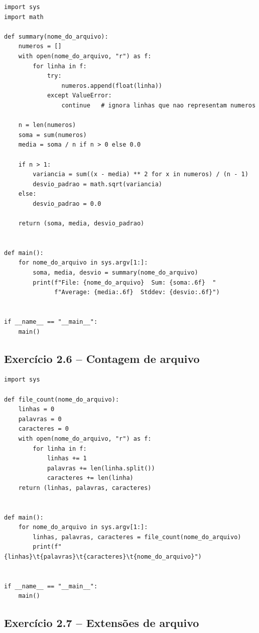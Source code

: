 \documentclass[11pt,a4paper]{article}
\begin{document}
\begin{solucao}
\begin{lstlisting}
import sys
import math

def summary(nome_do_arquivo):
    numeros = []
    with open(nome_do_arquivo, "r") as f:
        for linha in f:
            try:
                numeros.append(float(linha))
            except ValueError:
                continue   # ignora linhas que nao representam numeros

    n = len(numeros)
    soma = sum(numeros)
    media = soma / n if n > 0 else 0.0

    if n > 1:
        variancia = sum((x - media) ** 2 for x in numeros) / (n - 1)
        desvio_padrao = math.sqrt(variancia)
    else:
        desvio_padrao = 0.0

    return (soma, media, desvio_padrao)


def main():
    for nome_do_arquivo in sys.argv[1:]:
        soma, media, desvio = summary(nome_do_arquivo)
        print(f"File: {nome_do_arquivo}  Sum: {soma:.6f}  "
              f"Average: {media:.6f}  Stddev: {desvio:.6f}")


if __name__ == "__main__":
    main()
\end{lstlisting}
\end{solucao}

\subsection*{Exercício 2.6 -- Contagem de arquivo}

\begin{solucao}
\begin{lstlisting}
import sys

def file_count(nome_do_arquivo):
    linhas = 0
    palavras = 0
    caracteres = 0
    with open(nome_do_arquivo, "r") as f:
        for linha in f:
            linhas += 1
            palavras += len(linha.split())
            caracteres += len(linha)
    return (linhas, palavras, caracteres)


def main():
    for nome_do_arquivo in sys.argv[1:]:
        linhas, palavras, caracteres = file_count(nome_do_arquivo)
        print(f"{linhas}\t{palavras}\t{caracteres}\t{nome_do_arquivo}")


if __name__ == "__main__":
    main()
\end{lstlisting}
\end{solucao}

\subsection*{Exercício 2.7 -- Extensões de arquivo}
\end{document}
